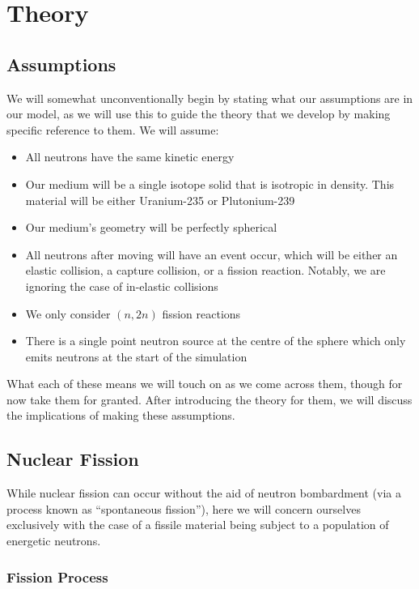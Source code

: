 

\section{Theory}

\subsection{Assumptions}

We will somewhat unconventionally begin by stating what our assumptions are in our model, as we will use this 
to guide the theory that we develop by making specific reference to them. We will assume:
\begin{itemize}
    \item All neutrons have the same kinetic energy
    \item Our medium will be a single isotope solid that is isotropic in density. This material will 
    be either Uranium-235 or Plutonium-239
    \item Our medium's geometry will be perfectly spherical
    \item All neutrons after moving will have an event occur, which will be either an elastic collision, a capture collision, 
    or a fission reaction. Notably, we are ignoring the case of in-elastic collisions
    \item We only consider $(n,2n)$ fission reactions
    \item There is a single point neutron source at the centre of the sphere which only emits neutrons at the start of the 
    simulation
\end{itemize}
What each of these means we will touch on as we come across them, though for now take them for granted. After introducing 
the theory for them, we will discuss the implications of making these assumptions.

\subsection{Nuclear Fission}

While nuclear fission can occur without the aid of neutron bombardment (via a process known as ``spontaneous fission''), here 
we will concern ourselves exclusively with the case of a fissile material being subject to a population of energetic neutrons. 

\subsubsection{Fission Process}

